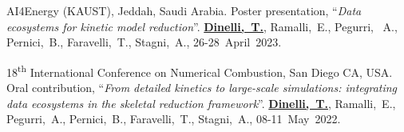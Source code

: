 \begin{etaremune}
   \item
      AI4Energy (KAUST), Jeddah, Saudi Arabia. Poster presentation, ``{\it Data ecosystems for
      kinetic model reduction}''. {\bf \underline{Dinelli,~T.}}, Ramalli,~E., Pegurri,
      ~A., Pernici,~B., Faravelli,~T., Stagni,~A.,
      26-28~April~2023.

   \item
      18\textsuperscript{th} International Conference on Numerical Combustion, San Diego
      CA, USA. Oral contribution, ``{\it From detailed kinetics to large-scale
      simulations: integrating data ecosystems in the skeletal reduction framework}''.
      {\bf \underline{Dinelli,~T.}}, Ramalli,~E., Pegurri,~A., Pernici,~B.,
      Faravelli,~T., Stagni,~A.,
      08-11~May~2022.
\end{etaremune}
